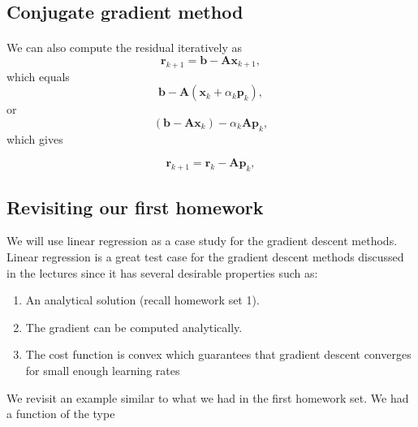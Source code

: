 \documentclass[%
oneside,                 %
final,                   %
10pt]{article}
\begin{document}
\subsection*{Conjugate gradient method}

\paragraph{}
We can also  compute the residual iteratively as
\begin{equation*}
\bm{r}_{k+1}=\bm{b}-\bm{A}\bm{x}_{k+1},
 \end{equation*}
which equals
\begin{equation*}
\bm{b}-\bm{A}(\bm{x}_k+\alpha_k\bm{p}_k),
 \end{equation*}
or
\begin{equation*}
(\bm{b}-\bm{A}\bm{x}_k)-\alpha_k\bm{A}\bm{p}_k,
 \end{equation*}
which gives

\begin{equation*}
\bm{r}_{k+1}=\bm{r}_k-\bm{A}\bm{p}_{k},
 \end{equation*}







\subsection*{Revisiting our first homework}

We will use linear regression as a case study for the gradient descent
methods. Linear regression is a great test case for the gradient
descent methods discussed in the lectures since it has several
desirable properties such as:

\begin{enumerate}
\item An analytical solution (recall homework set 1).

\item The gradient can be computed analytically.

\item The cost function is convex which guarantees that gradient descent converges for small enough learning rates
\end{enumerate}

\noindent
We revisit an example similar to what we had in the first homework set. We had a function  of the type
\end{document}
